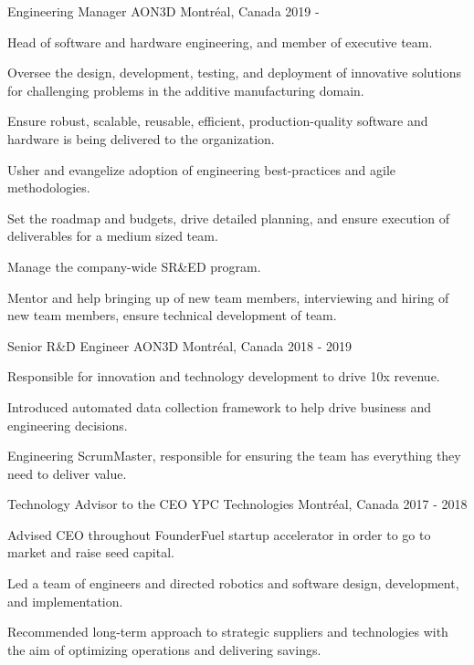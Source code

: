 \begin{cventries}

\cventry
{Engineering Manager}
{AON3D}
{Montréal, Canada}
{2019 - }
{
\begin{cvitems}
\item{Head of software and hardware engineering, and member of executive team.}
\item{Oversee the design, development, testing, and deployment of innovative solutions for challenging problems in the additive manufacturing domain.}
\item{Ensure robust, scalable, reusable, efficient, production-quality software and hardware is being delivered to the organization.}
\item{Usher and evangelize adoption of engineering best-practices and agile methodologies.}
\item{Set the roadmap and budgets, drive detailed planning, and ensure execution of deliverables for a medium sized team.}
\item{Manage the company-wide SR\&ED program.}
\item{Mentor and help bringing up of new team members, interviewing and hiring of new team members, ensure technical development of team.}
\end{cvitems}
}

\cventry
{Senior R\&D Engineer}
{AON3D}
{Montréal, Canada}
{2018 - 2019}
{
\begin{cvitems}
\item{Responsible for innovation and technology development to drive 10x revenue.}
\item{Introduced automated data collection framework to help drive business and engineering decisions.}
\item{Engineering ScrumMaster, responsible for ensuring the team has everything they need to deliver value.}
\end{cvitems}
}

\cventry
{Technology Advisor to the CEO}
{YPC Technologies}
{Montréal, Canada}
{2017 - 2018}
{
\begin{cvitems}
\item{Advised CEO throughout FounderFuel startup accelerator in order to go to market and raise seed capital.}
\item{Led a team of engineers and directed robotics and software design, development, and implementation.}
\item{Recommended long-term approach to strategic suppliers and technologies with the aim of optimizing operations and delivering savings.}
\end{cvitems}
}


\end{cventries}
